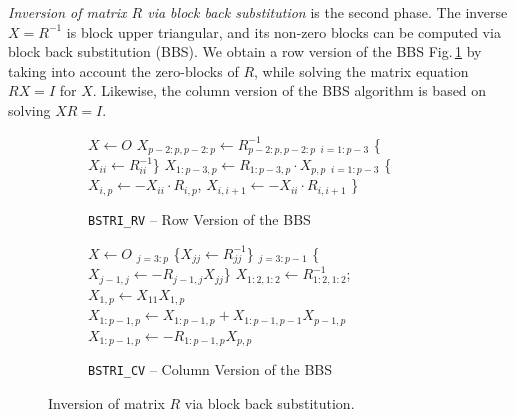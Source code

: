 \documentclass{llncs}
\begin{document}
\textit{Inversion of matrix $R$ via block back substitution} 
is the second phase. The inverse $X = R^{-1}$ is block upper triangular,
and its non-zero blocks can be computed
via block back substitution (BBS).
We obtain a row version of the BBS Fig.\,\ref{alg:BSTRI_RV}
by taking into account the zero-blocks of $R$,
while solving the matrix equation $R X = I$ for $X$. 
Likewise, the column version of the BBS algorithm is based on 
solving $X R = I$.
\begin{figure}[t]%
  \centering
  \begin{subfigure}[t]{0.45\linewidth}%
    \begin{algorithm}[H]

      \BlankLine

      $X \gets O$\; 
      $X_{p-2:p,p-2:p}\gets R_{p-2:p,p-2:p}^{-1}$\;
      \Batched$_{i = 1:p-3}$ \{$X_{ii}\gets R_{ii}^{-1}$\} \;
      $X_{1:p-3,p}\gets R_{1:p-3,p}\cdot X_{p,p} $ \;
      \Batched$_{i = 1:p-3}$ \{$X_{i,p}\gets -X_{ii} \cdot R_{i,p}$, $X_{i,i+1}\gets -X_{ii} \cdot R_{i,i+1}$ \} \;
    \end{algorithm}    
    \caption{{\tt BSTRI\_RV} -- Row Version of the BBS
      \label{alg:BSTRI_RV}}
  \end{subfigure}
  \hfill
  \begin{subfigure}[t]{0.54\linewidth}%
    \begin{algorithm}[H]

      \BlankLine

      $X \gets O$\; 
      \Batched$_{j = 3:p}$ \{$X_{jj}\gets R_{jj}^{-1}$\}\;
      \Batched$_{j = 3:p-1}$ \{$X_{j-1,j}\gets -R_{j-1,j} X_{jj} $\}\;
      $X_{1:2,1:2}\gets R_{1:2,1:2}^{-1}$; $X_{1,p}\gets X_{11} X_{1,p} $\;
      $X_{1:p-1,p}\gets X_{1:p-1,p} + X_{1:p-1,p-1} X_{p-1,p}$\;
      $X_{1:p-1,p}\gets -R_{1:p-1,p} X_{p,p} $\;%
    \end{algorithm}    
    \caption{{\tt BSTRI\_CV} -- Column Version of the BBS
      \label{alg:BSTRI_CV}}
  \end{subfigure}
  \caption[]{Inversion of matrix $R$ via block back substitution.\footnotemark
    \label{alg:BSTRI}}
\end{figure}
\end{document}

